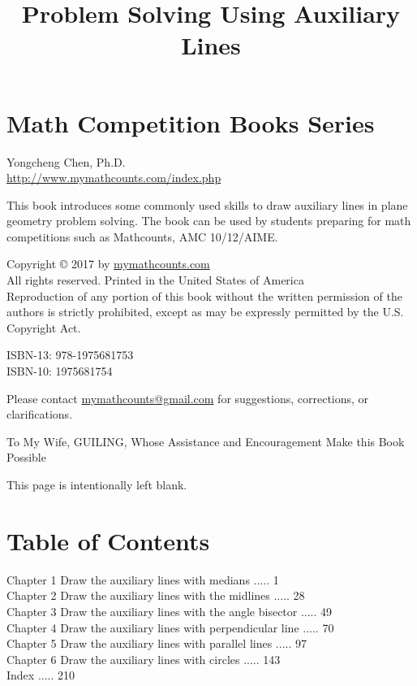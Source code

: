 \documentclass[10pt]{article}
\title{Problem Solving Using Auxiliary Lines }
\author{}
\date{}
\begin{document}
\maketitle
\section*{Math Competition Books Series}
Yongcheng Chen, Ph.D.\\
\href{http://www.mymathcounts.com/index.php}{http://www.mymathcounts.com/index.php}

This book introduces some commonly used skills to draw auxiliary lines in plane geometry problem solving. The book can be used by students preparing for math competitions such as Mathcounts, AMC 10/12/AIME.

Copyright © 2017 by \href{http://mymathcounts.com}{mymathcounts.com}\\
All rights reserved. Printed in the United States of America\\
Reproduction of any portion of this book without the written permission of the authors is strictly prohibited, except as may be expressly permitted by the U.S. Copyright Act.

ISBN-13: 978-1975681753\\
ISBN-10: 1975681754

Please contact \href{mailto:mymathcounts@gmail.com}{mymathcounts@gmail.com} for suggestions, corrections, or clarifications.

To My Wife, GUILING, Whose Assistance and Encouragement Make this Book Possible

This page is intentionally left blank.

\section*{Table of Contents}
Chapter 1 Draw the auxiliary lines with medians ..... 1\\
Chapter 2 Draw the auxiliary lines with the midlines ..... 28\\
Chapter 3 Draw the auxiliary lines with the angle bisector ..... 49\\
Chapter 4 Draw the auxiliary lines with perpendicular line ..... 70\\
Chapter 5 Draw the auxiliary lines with parallel lines ..... 97\\
Chapter 6 Draw the auxiliary lines with circles ..... 143\\
Index ..... 210
\end{document}
